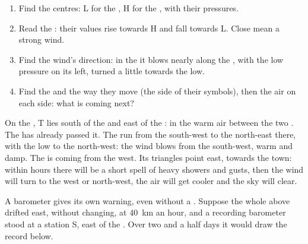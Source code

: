 \begin{method}
\begin{enumerate}
  \item Find the centres: L for the , H for the ,
        with their pressures.
  \item Read the : their values rise towards H and fall towards L.
        Close  mean a strong wind.
  \item Find the wind's direction: in the  it blows
        nearly along the , with the low pressure on its left,
        turned a little towards the low.
  \item Find the  and the way they move (the side of their
        symbols), then the air on each side: what is coming next?
\end{enumerate}
\end{method}

\begin{example}
On the , T lies south of the  and east of the : in
the warm air between the two . The  has already passed
it. The  run from the south-west to the north-east there, with the
low to the north-west: the wind blows from the south-west, warm and damp.
The  is coming from the west. Its triangles point east,
towards the town: within hours there will be a short spell of heavy
showers and gusts, then the wind will turn to the west or north-west, the
air will get cooler and the sky will clear.
\end{example}

A barometer gives its own warning, even without a . Suppose the whole
 above drifted east, without changing, at \qty{40}{km} an hour, and a
recording barometer stood at a station S, east of the . Over two and
a half days it would draw the record below.

